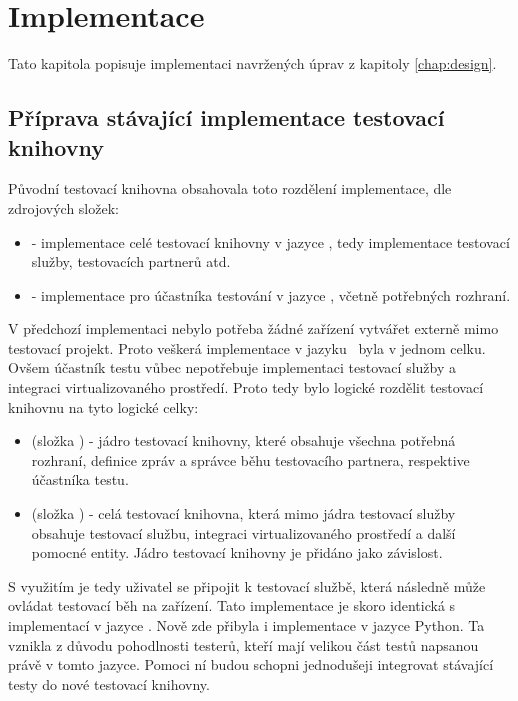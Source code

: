 \chapter{Implementace}\label{chap:implementation}

Tato kapitola popisuje implementaci navržených úprav z kapitoly \ref{chap:design}.


\section{Příprava stávající implementace testovací knihovny}
Původní testovací knihovna obsahovala toto rozdělení implementace, dle zdrojových složek:

\begin{itemize}
    \item {} - implementace celé testovací knihovny v jazyce \csharp, tedy implementace testovací služby, testovacích partnerů atd.
    \item {} - implementace pro účastníka testování v jazyce \cpp, včetně potřebných rozhraní.
\end{itemize}

V předchozí implementaci nebylo potřeba žádné zařízení vytvářet externě mimo testovací projekt. Proto veškerá implementace v jazyku \csharp\, byla v jednom celku. Ovšem účastník testu vůbec nepotřebuje implementaci testovací služby a integraci virtualizovaného prostředí. Proto tedy bylo logické rozdělit testovací knihovnu na tyto logické celky:

\begin{itemize}
    \item {} (složka ) - jádro testovací knihovny, které obsahuje všechna potřebná rozhraní, definice zpráv a správce běhu testovacího partnera, respektive účastníka testu.
    \item {} (složka ) - celá testovací knihovna, která mimo jádra testovací služby obsahuje testovací službu, integraci virtualizovaného prostředí a další pomocné entity. Jádro testovací knihovny je přidáno jako závislost. 
\end{itemize}

S využitím  je tedy uživatel se připojit k testovací službě, která následně může ovládat testovací běh na zařízení. Tato implementace je skoro identická s implementací v jazyce \cpp. Nově zde přibyla i implementace v jazyce Python. Ta vznikla z důvodu pohodlnosti testerů, kteří mají velikou část testů napsanou právě v tomto jazyce. Pomoci ní budou schopni jednodušeji integrovat stávající testy do nové testovací knihovny. 

